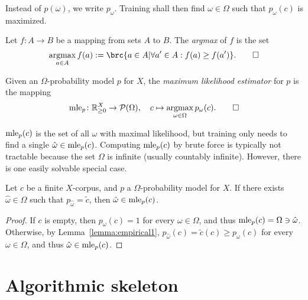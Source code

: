 Instead of $p(\omega)$, we write $p_\omega$. Training shall then find
$\omega\in\Omega$ such that $p_\omega(c)$ is maximized.

\begin{definition}
 Let $f\colon A\to B$ be a mapping from sets $A$ to $B$. The \emph{argmax} of $f$ is the set
 \[
  \argmax_{a\in A} f(a) := \brc{a\in A|\forall a'\in A: f(a) \geq f(a')}.\qedhere
 \]
\end{definition}

\begin{definition}
 Given an $\Omega$-probability model $p$ for $X$, the
 \emph{maximum likelihood estimator} for $p$ is the mapping
 \[
  \mle_p\colon \zr_{\geq0}^X \to \up(\Omega),
  \quad
  c \mapsto \argmax_{\omega\in\Omega} p_\omega(c).\qedhere
 \]
\end{definition}

$\operatorname{mle}_p(c)$ is the set of all $\omega$ with maximal likelihood, but training
only needs to find a single $\hat\omega \in \operatorname{mle}_p(c)$. Computing $\operatorname{mle}_p(c)$
by brute force is typically not tractable because the set $\Omega$ is infinite
(usually countably infinite). However, there is one easily solvable special
case.

\begin{lemma}\label{lemma:empirical2}
 Let $c$ be a finite $X$-corpus, and $p$ a $\Omega$-probability model for $X$.
 If there exists $\hat\omega\in\Omega$ such that $p_{\hat\omega} = \tilde c$,
 then $\hat\omega\in\operatorname{mle}_p(c)$.
\end{lemma}

\begin{proof}
 If $c$ is empty, then $p_\omega(c) = 1$ for every $\omega\in\Omega$, and thus
 $\operatorname{mle}_p(c) = \Omega \ni \hat\omega$. Otherwise, by
 Lemma~\ref{lemma:empirical1}, $p_{\hat\omega}(c) = \tilde c(c) \geq
 p_\omega(c)$ for every $\omega\in\Omega$, and thus $\hat\omega \in \operatorname{mle}_p(c)$.
\end{proof}

\section{Algorithmic skeleton}

